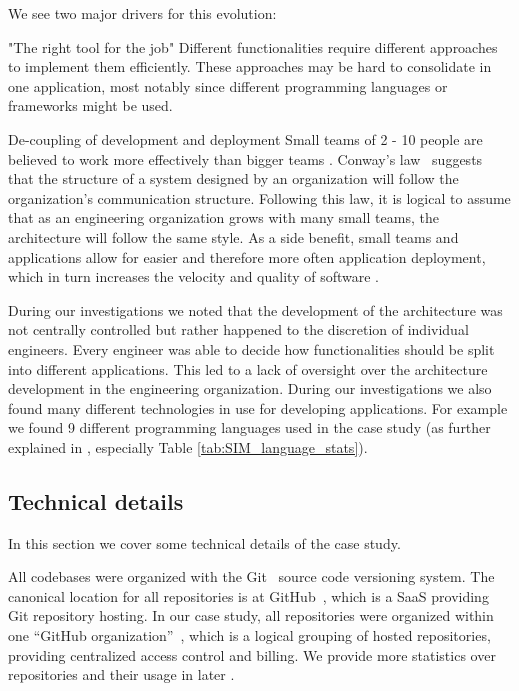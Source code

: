 We see two major drivers for this evolution:
\begin{tdescription}
  \item["The right tool for the job"] Different functionalities require different approaches to implement them efficiently. These approaches may be hard to consolidate in one application, most notably since different programming languages or frameworks might be used.
  \item[De-coupling of development and deployment] Small teams of 2 - 10 people are believed to work more effectively than bigger teams \cite{HenrikKniberg}. Conway's law~\cite{conway} suggests that the structure of a system designed by an organization will follow the organization's communication structure. Following this law, it is logical to assume that as an engineering organization grows with many small teams, the architecture will follow the same style. As a side benefit, small teams and applications allow for easier and therefore more often application deployment, which in turn increases the velocity and quality of software \cite{fowler-microservices} \cite{ContinuousDelivery}.
\end{tdescription}

During our investigations we noted that the development of the architecture was not centrally controlled but rather happened to the discretion of individual engineers. Every engineer was able to decide how functionalities should be split into different applications. This led to a lack of oversight over the architecture development in the engineering organization. During our investigations we also found many different technologies in use for developing applications. For example we found 9 different programming languages used in the case study (as further explained in , especially Table \ref{tab:SIM_language_stats}).

\subsection{Technical details}
\label{subsec:case_study_tech_details}

In this section we cover some technical details of the case study.

All codebases were organized with the Git~\cite{ProGit} source code versioning system. The canonical location for all repositories is at GitHub~\cite{github}, which is a SaaS providing Git repository hosting.
In our case study, all repositories were organized within one ``GitHub organization''~\cite{ghorgs}, which is a logical grouping of hosted repositories, providing centralized access control and billing. We provide more statistics over repositories and their usage in later  .

